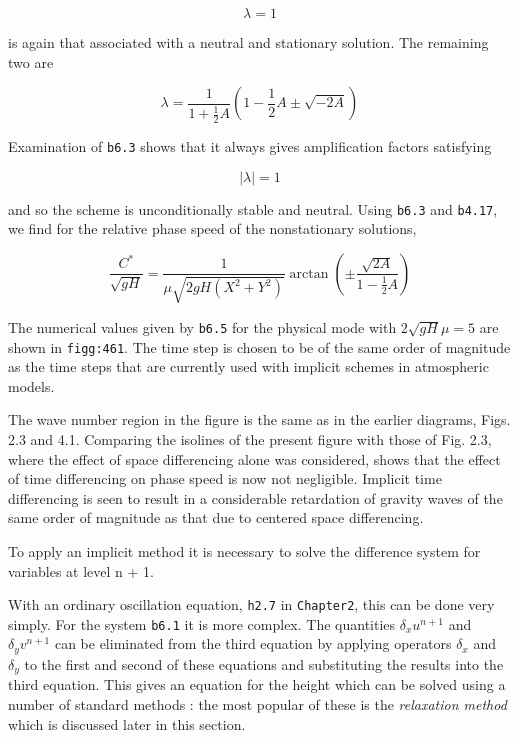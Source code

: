 \[\lambda = 1\]

is again that associated with a neutral and stationary solution. The
remaining two are

\[\lambda = \frac{1}{1 + \frac{1}{2}A}\left( 1 - \frac{1}{2}A \pm \sqrt{- 2A} \right)\]

Examination of \texttt{b6.3} shows that it always gives amplification
factors satisfying

\[\left| \lambda \right| = 1\]

and so the scheme is unconditionally stable and neutral. Using
\texttt{b6.3} and \texttt{b4.17}, we find for the relative phase speed
of the nonstationary solutions,

\[\frac{C^{*}}{\sqrt{gH}} = \frac{1}{\mu\sqrt{2gH(X^{2} + Y^{2})}}\arctan{( \pm \frac{\sqrt{2A}}{1 - \frac{1}{2}A} )}\]

The numerical values given by \texttt{b6.5} for the physical mode with
\(2\sqrt{gH}\mu = 5\) are shown in \texttt{figg:461}. The time step is
chosen to be of the same order of magnitude as the time steps that are
currently used with implicit schemes in atmospheric models.


The wave number region in the figure is the same as in the earlier
diagrams, Figs. 2.3 and 4.1. Comparing the isolines of the present
figure with those of Fig. 2.3, where the effect of space differencing
alone was considered, shows that the effect of time differencing on
phase speed is now not negligible. Implicit time differencing is seen to
result in a considerable retardation of gravity waves of the same order
of magnitude as that due to centered space differencing.

To apply an implicit method it is necessary to solve the difference
system for variables at level n + 1.

With an ordinary oscillation equation, \texttt{h2.7} in
\texttt{Chapter2}, this can be done very simply. For the system
\texttt{b6.1} it is more complex. The quantities \(\delta_{x}u^{n + 1}\)
and \(\delta_{y}v^{n + 1}\) can be eliminated from the third equation by
applying operators \(\delta_{x}\) and \(\delta_{y}\) to the first and
second of these equations and substituting the results into the third
equation. This gives an equation for the height which can be solved
using a number of standard methods : the most popular of these is the
\emph{relaxation method} which is discussed later in this section.

